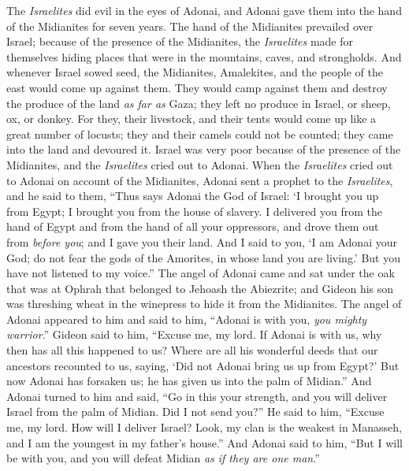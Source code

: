 \begin{biblechapter} %
 The \textit{Israelites} did evil in the eyes of Adonai, and Adonai gave them into the hand of the Midianites for seven years.
\verse The hand of the Midianites prevailed over Israel; because of the presence of the Midianites, the \textit{Israelites} made for themselves hiding places that were in the mountains, caves, and strongholds.
\verse And whenever Israel sowed seed, the Midianites, Amalekites, and the people of the east would come up against them.
\verse They would camp against them and destroy the produce of the land \textit{as far as} Gaza; they left no produce in Israel, or sheep, ox, or donkey.
\verse For they, their livestock, and their tents would come up like a great number of locusts; they and their camels could not be counted; they came into the land and devoured it.
\verse Israel was very poor because of the presence of the Midianites, and the \textit{Israelites} cried out to Adonai.
\verse When the \textit{Israelites} cried out to Adonai on account of the Midianites,
\verse Adonai sent a prophet to the \textit{Israelites}, and he said to them, “Thus says Adonai the God of Israel: ‘I brought you up from Egypt; I brought you from the house of slavery.
\verse I delivered you from the hand of Egypt and from the hand of all your oppressors, and drove them out from \textit{before you}; and I gave you their land.
\verse And I said to you, ‘I am Adonai your God; do not fear the gods of the Amorites, in whose land you are living.’ But you have not listened to my voice.”
 The angel of Adonai came and sat under the oak that was at Ophrah that belonged to Jehoash the Abiezrite; and Gideon his son was threshing wheat in the winepress to hide it from the Midianites.
\verse The angel of Adonai appeared to him and said to him, “Adonai is with you, \textit{you mighty warrior}.”
\verse Gideon said to him, “Excuse me, my lord. If Adonai is with us, why then has all this happened to us? Where are all his wonderful deeds that our ancestors recounted to us, saying, ‘Did not Adonai bring us up from Egypt?’ But now Adonai has forsaken us; he has given us into the palm of Midian.”
\verse And Adonai turned to him and said, “Go in this your strength, and you will deliver Israel from the palm of Midian. Did I not send you?”
\verse He said to him, “Excuse me, my lord. How will I deliver Israel? Look, my clan is the weakest in Manasseh, and I am the youngest in my father’s house.”
\verse And Adonai said to him, “But I will be with you, and you will defeat Midian \textit{as if they are one man}.”

\end{biblechapter}
